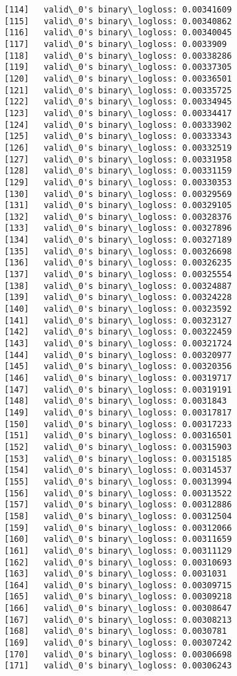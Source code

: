 \documentclass[11pt]{article}
\begin{document}
\begin{Verbatim}[commandchars=\\\{\}]
[114]	valid\_0's binary\_logloss: 0.00341609
[115]	valid\_0's binary\_logloss: 0.00340862
[116]	valid\_0's binary\_logloss: 0.00340045
[117]	valid\_0's binary\_logloss: 0.0033909
[118]	valid\_0's binary\_logloss: 0.00338286
[119]	valid\_0's binary\_logloss: 0.00337305
[120]	valid\_0's binary\_logloss: 0.00336501
[121]	valid\_0's binary\_logloss: 0.00335725
[122]	valid\_0's binary\_logloss: 0.00334945
[123]	valid\_0's binary\_logloss: 0.00334417
[124]	valid\_0's binary\_logloss: 0.00333902
[125]	valid\_0's binary\_logloss: 0.00333343
[126]	valid\_0's binary\_logloss: 0.00332519
[127]	valid\_0's binary\_logloss: 0.00331958
[128]	valid\_0's binary\_logloss: 0.00331159
[129]	valid\_0's binary\_logloss: 0.00330353
[130]	valid\_0's binary\_logloss: 0.00329569
[131]	valid\_0's binary\_logloss: 0.00329105
[132]	valid\_0's binary\_logloss: 0.00328376
[133]	valid\_0's binary\_logloss: 0.00327896
[134]	valid\_0's binary\_logloss: 0.00327189
[135]	valid\_0's binary\_logloss: 0.00326698
[136]	valid\_0's binary\_logloss: 0.00326235
[137]	valid\_0's binary\_logloss: 0.00325554
[138]	valid\_0's binary\_logloss: 0.00324887
[139]	valid\_0's binary\_logloss: 0.00324228
[140]	valid\_0's binary\_logloss: 0.00323592
[141]	valid\_0's binary\_logloss: 0.00323127
[142]	valid\_0's binary\_logloss: 0.00322459
[143]	valid\_0's binary\_logloss: 0.00321724
[144]	valid\_0's binary\_logloss: 0.00320977
[145]	valid\_0's binary\_logloss: 0.00320356
[146]	valid\_0's binary\_logloss: 0.00319717
[147]	valid\_0's binary\_logloss: 0.00319191
[148]	valid\_0's binary\_logloss: 0.0031843
[149]	valid\_0's binary\_logloss: 0.00317817
[150]	valid\_0's binary\_logloss: 0.00317233
[151]	valid\_0's binary\_logloss: 0.00316501
[152]	valid\_0's binary\_logloss: 0.00315903
[153]	valid\_0's binary\_logloss: 0.00315185
[154]	valid\_0's binary\_logloss: 0.00314537
[155]	valid\_0's binary\_logloss: 0.00313994
[156]	valid\_0's binary\_logloss: 0.00313522
[157]	valid\_0's binary\_logloss: 0.00312886
[158]	valid\_0's binary\_logloss: 0.00312504
[159]	valid\_0's binary\_logloss: 0.00312066
[160]	valid\_0's binary\_logloss: 0.00311659
[161]	valid\_0's binary\_logloss: 0.00311129
[162]	valid\_0's binary\_logloss: 0.00310693
[163]	valid\_0's binary\_logloss: 0.0031031
[164]	valid\_0's binary\_logloss: 0.00309715
[165]	valid\_0's binary\_logloss: 0.00309218
[166]	valid\_0's binary\_logloss: 0.00308647
[167]	valid\_0's binary\_logloss: 0.00308213
[168]	valid\_0's binary\_logloss: 0.0030781
[169]	valid\_0's binary\_logloss: 0.00307242
[170]	valid\_0's binary\_logloss: 0.00306698
[171]	valid\_0's binary\_logloss: 0.00306243

\end{Verbatim}
\end{document}
